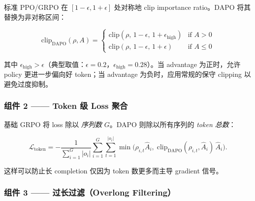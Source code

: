 标准 PPO/GRPO 在 $[1-\epsilon, 1+\epsilon]$ 处对称地 clip importance ratio。DAPO 将其替换为非对称区间：

\[
\boxed{
    \mathrm{clip}_{\text{DAPO}}(\rho, A) =
    \begin{cases}
      \mathrm{clip}(\rho,\, 1-\epsilon,\, 1+\epsilon_{\text{high}}) & \text{if } A > 0 \\
      \mathrm{clip}(\rho,\, 1-\epsilon,\, 1+\epsilon) & \text{if } A \le 0
    \end{cases}
  }
\]

其中 $\epsilon_{\text{high}} > \epsilon$（典型取值：$\epsilon=0.2$，$\epsilon_{\text{high}}=0.28$）。当 advantage 为正时，允许 policy 更进一步偏向好 token；当 advantage 为负时，应用常规的保守 clipping 以避免过度抑制。

\subsubsection*{组件 2 —— Token 级 Loss 聚合}
\label{component-2-token-level-loss-aggregation}

基础 GRPO 将 loss 除以 \emph{序列数} $G$。DAPO 则除以所有序列的 \emph{token 总数}：

\[
\mathcal{L}_{\text{token}} =
    -\frac{1}{\sum_{i=1}^G |o_i|}
    \sum_{i=1}^G \sum_{t=1}^{|o_i|}
    \min\!\bigl(\rho_{i,t}\hat{A}_i,\;
                \mathrm{clip}_{\text{DAPO}}(\rho_{i,t},\hat{A}_i)\,\hat{A}_i\bigr).
\]

这样可以防止长 completion 仅因为 token 数更多而主导 gradient 信号。

\subsubsection*{组件 3 —— 过长过滤（Overlong Filtering）}
\label{component-3-overlong-filtering}

